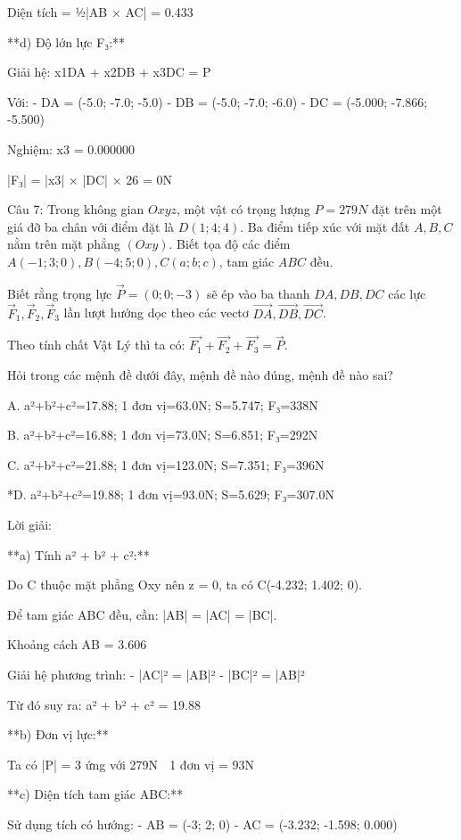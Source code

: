 \documentclass[a4paper,12pt]{article}
\begin{document}
Diện tích = ½|AB⃗ × AC⃗| = 0.433

**d) Độ lớn lực F₃:**

Giải hệ: x1DA⃗ + x2DB⃗ + x3DC⃗ = P⃗

Với:
- DA⃗ = (-5.0; -7.0; -5.0)
- DB⃗ = (-5.0; -7.0; -6.0)
- DC⃗ = (-5.000; -7.866; -5.500)

Nghiệm: x3 = 0.000000

|F₃| = |x3| × |DC⃗| × 26 = 0N




Câu 7: Trong không gian \(Oxyz\), một vật có trọng lượng \(P=279N\) đặt trên một giá đỡ ba chân với điểm đặt là \(D(1; 4; 4)\). Ba điểm tiếp xúc với mặt đất \(A, B, C\) nằm trên mặt phẳng \((Oxy)\). Biết tọa độ các điểm \(A(-1; 3; 0), B(-4; 5; 0), C(a; b; c)\), tam giác \(ABC\) đều. 

Biết rằng trọng lực \(\overrightarrow{P}=(0; 0; -3)\) sẽ ép vào ba thanh \(DA, DB, DC\) các lực \(\overrightarrow{F}_1, \overrightarrow{F}_2, \overrightarrow{F}_3\) lần lượt hướng dọc theo các vectơ \(\overrightarrow{DA}, \overrightarrow{DB}, \overrightarrow{DC}\). 

Theo tính chất Vật Lý thì ta có: \(\overrightarrow{F_1}+\overrightarrow{F_2}+\overrightarrow{F_3}=\overrightarrow{P}\).

Hỏi trong các mệnh đề dưới đây, mệnh đề nào đúng, mệnh đề nào sai?

A. a²+b²+c²=17.88; 1 đơn vị=63.0N; S=5.747; F₃=338N

B. a²+b²+c²=16.88; 1 đơn vị=73.0N; S=6.851; F₃=292N

C. a²+b²+c²=21.88; 1 đơn vị=123.0N; S=7.351; F₃=396N

*D. a²+b²+c²=19.88; 1 đơn vị=93.0N; S=5.629; F₃=307.0N

Lời giải:


**a) Tính a² + b² + c²:**

Do C thuộc mặt phẳng Oxy nên z = 0, ta có C(-4.232; 1.402; 0).

Để tam giác ABC đều, cần: |AB| = |AC| = |BC|.

Khoảng cách AB = 3.606

Giải hệ phương trình:
- |AC|² = |AB|²  
- |BC|² = |AB|²

Từ đó suy ra: a² + b² + c² = 19.88

**b) Đơn vị lực:**

Ta có |P⃗| = 3 ứng với 279N
⟹ 1 đơn vị = 93N

**c) Diện tích tam giác ABC:**

Sử dụng tích có hướng:
- AB⃗ = (-3; 2; 0)
- AC⃗ = (-3.232; -1.598; 0.000)
\end{document}
